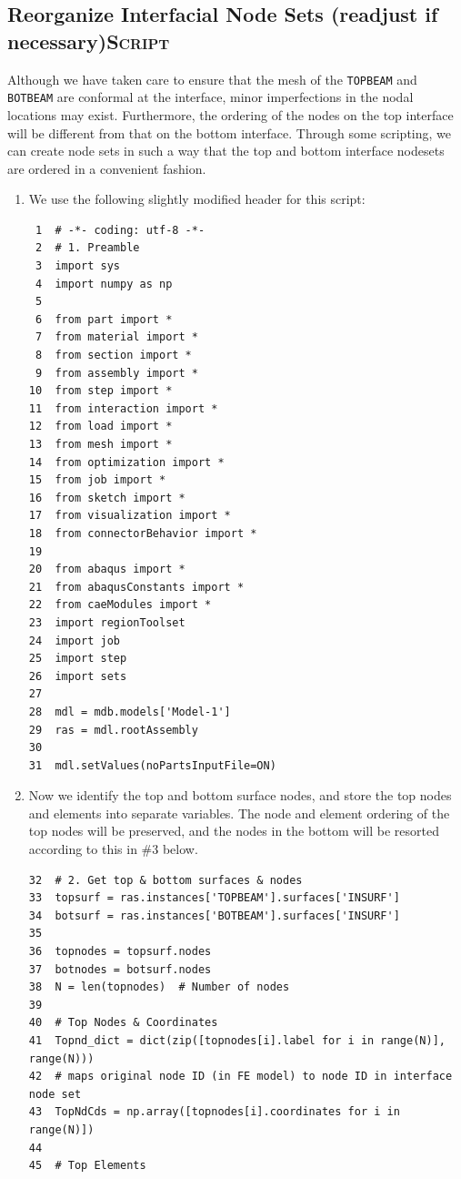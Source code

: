 \documentclass[11pt]{article}
\begin{document}
\subsection{Reorganize Interfacial Node Sets (readjust if necessary)\hfill{}\textsc{Script}}
\label{sec:orgd752667}
Although we have taken care to ensure that the mesh of the \texttt{TOPBEAM} and \texttt{BOTBEAM} are conformal at the interface, minor imperfections in the nodal locations may exist.
Furthermore, the ordering of the nodes on the top interface will be different from that on the bottom interface.
Through some scripting, we can create node sets in such a way that the top and bottom interface nodesets are ordered in a convenient fashion.
\begin{enumerate}
\item We use the following slightly modified header for this script:
\begin{verbatim}
 1  # -*- coding: utf-8 -*-
 2  # 1. Preamble
 3  import sys
 4  import numpy as np
 5  
 6  from part import *
 7  from material import *
 8  from section import *
 9  from assembly import *
10  from step import *
11  from interaction import *
12  from load import *
13  from mesh import *
14  from optimization import *
15  from job import *
16  from sketch import *
17  from visualization import *
18  from connectorBehavior import *
19  
20  from abaqus import *
21  from abaqusConstants import *
22  from caeModules import * 
23  import regionToolset
24  import job
25  import step
26  import sets
27  
28  mdl = mdb.models['Model-1']
29  ras = mdl.rootAssembly
30  
31  mdl.setValues(noPartsInputFile=ON)
\end{verbatim}
\item Now we identify the top and bottom surface nodes, and store the top nodes and elements into separate variables.
The node and element ordering of the top nodes will be preserved, and the nodes in the bottom will be resorted according to this in \#3 below.
\begin{verbatim}
32  # 2. Get top & bottom surfaces & nodes
33  topsurf = ras.instances['TOPBEAM'].surfaces['INSURF']
34  botsurf = ras.instances['BOTBEAM'].surfaces['INSURF']
35  
36  topnodes = topsurf.nodes
37  botnodes = botsurf.nodes
38  N = len(topnodes)  # Number of nodes
39  
40  # Top Nodes & Coordinates
41  Topnd_dict = dict(zip([topnodes[i].label for i in range(N)], range(N)))
42  # maps original node ID (in FE model) to node ID in interface node set
43  TopNdCds = np.array([topnodes[i].coordinates for i in range(N)])
44  
45  # Top Elements

\end{verbatim}
\end{enumerate}
\end{document}
